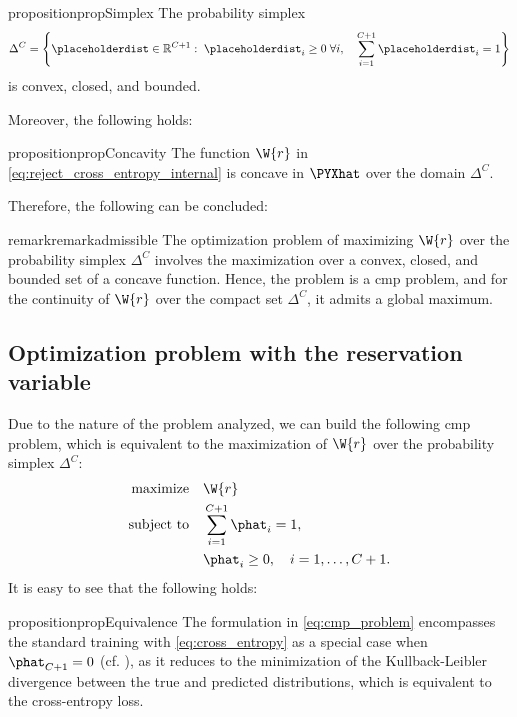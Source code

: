 \begin{restatable}{proposition}{propSimplex}
    \label{prop:simplex_properties}
    The probability simplex
    \[
        \Delta^{C}
        =
        \left\{
        \placeholderdist \in \mathbb{R}^{C+1}
        :\;
        \placeholderdist_i \ge 0 \;\forall i,
        \quad
        \sum_{i=1}^{C+1} \placeholderdist_i = 1
        \right\}
    \]
    is convex, closed, and bounded.
\end{restatable}
Moreover, the following holds:
\begin{restatable}{proposition}{propConcavity}
    \label{prop:concavity}
    The function \(\W{r}\) in \cref{eq:reject_cross_entropy_internal} is concave in \(\PYXhat\) over the domain \(\Delta^{C}\).
\end{restatable}
Therefore, the following can be concluded:
\begin{restatable}{remark}{remarkadmissible}
    \label{remark:admissible}
    The optimization problem of maximizing \(\W{r}\) over the probability simplex \(\Delta^{C}\) involves the maximization over a convex, closed, and bounded set of a concave function. Hence, the problem is a \gls*{cmp} problem, and for the continuity of \(\W{r}\) over the compact set \(\Delta^{C}\), it admits a global maximum.
\end{restatable}

\subsection{Optimization problem with the reservation variable}
Due to the nature of the problem analyzed, we can build the following \gls*{cmp} problem, which is equivalent to the maximization of \(\W{r}\) over the probability simplex \(\Delta^{C}\):
\begin{align}
    \label{eq:cmp_problem}
    \begin{aligned}
        \text{maximize}\quad   & \W{r}                               \\
        \text{subject to}\quad & \sum_{i=1}^{C+1} \phat_i = 1,       \\
                               & \phat_i \ge 0, \quad i=1,\dots,C+1.
    \end{aligned}
\end{align}
It is easy to see that the following holds:
\begin{restatable}{proposition}{propEquivalence}
    \label{prop:equivalence}
    The formulation in \cref{eq:cmp_problem} encompasses the standard training with \cref{eq:cross_entropy} as a special case when \(\phat_{C+1}=0\) (cf. \cite{liu2019deep}), as it reduces to the minimization of the Kullback-Leibler divergence between the true and predicted distributions, which is equivalent to the cross-entropy loss.
\end{restatable}

